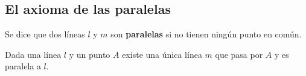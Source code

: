 \subsection{El axioma de las paralelas}

\begin{defin*}
	Se dice que dos líneas $l$ y $m$ son \textbf{paralelas} si no tienen ningún
	punto en común.
\end{defin*}


\begin{axb}[P]\label{ax:P}
	Dada una línea $l$ y un punto $A$ existe una única línea $m$ que pasa por
	$A$ y es paralela a $l$.
\end{axb}

